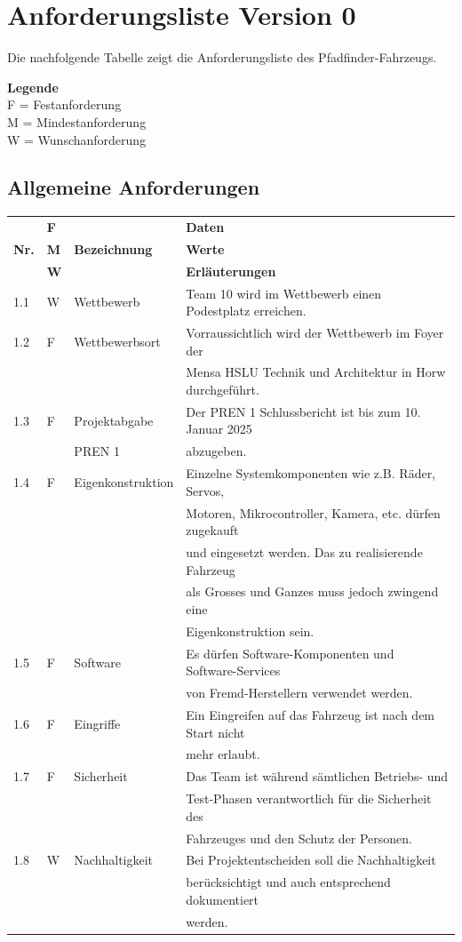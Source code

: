\documentclass[../main.tex]{subfiles}
\begin{document}
\section{Anforderungsliste Version 0}

Die nachfolgende Tabelle zeigt die Anforderungsliste des Pfadfinder-Fahrzeugs.

\textbf{Legende} \\ F = Festanforderung \\ M = Mindestanforderung \\ W = Wunschanforderung

\subsection{Allgemeine Anforderungen}
\begin{tabular}{|l|l|l|l|}
  \hline
  & \textbf{F} & & \textbf{Daten} \\
  \textbf{Nr.} & \textbf{M} & \textbf{Bezeichnung} & \textbf{Werte} \\
  & \textbf{W} & & \textbf{Erläuterungen} \\
  \hline
  1.1 & W & Wettbewerb & Team 10 wird im Wettbewerb einen Podestplatz
  erreichen. \\
  \hline
  1.2 & F & Wettbewerbsort & Vorraussichtlich wird der Wettbewerb im
  Foyer der \\
  & & & Mensa HSLU Technik und Architektur in Horw durchgeführt. \\
  \hline
  1.3 & F & Projektabgabe & Der PREN 1 Schlussbericht ist bis zum 10.
  Januar 2025 \\
  & & PREN 1 & abzugeben. \\
  \hline
  1.4 & F & Eigenkonstruktion & Einzelne Systemkomponenten wie z.B.
  Räder, Servos, \\
  & & & Motoren, Mikrocontroller, Kamera, etc. dürfen zugekauft \\
  & & & und eingesetzt werden. Das zu realisierende Fahrzeug \\
  & & & als Grosses und Ganzes muss jedoch zwingend eine \\
  & & & Eigenkonstruktion sein. \\
  \hline
  1.5 & F & Software & Es dürfen Software-Komponenten und Software-Services \\
  & & & von Fremd-Herstellern verwendet werden. \\
  \hline
  1.6 & F & Eingriffe & Ein Eingreifen auf das Fahrzeug ist nach dem
  Start nicht \\
  & & & mehr erlaubt. \\
  \hline
  1.7 & F & Sicherheit & Das Team ist während sämtlichen Betriebs- und \\
  & & & Test-Phasen verantwortlich für die Sicherheit des \\
  & & & Fahrzeuges und den Schutz der Personen. \\
  \hline
  1.8 & W & Nachhaltigkeit & Bei Projektentscheiden soll die Nachhaltigkeit \\
  & & & berücksichtigt und auch entsprechend dokumentiert \\
  & & & werden. \\
  \hline
\end{tabular}
\end{document}
